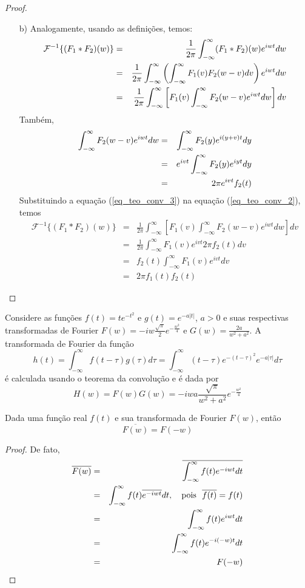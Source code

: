 \begin{proof}
\begin{itemize}
\item[b)] Analogamente, usando as definições, temos:
\begin{eqnarray}
\nonumber\mathcal{F}^{-1}\{(F_1*F_2)(w)\}&=&\frac{1}{2\pi}\int_{-\infty}^\infty (F_1*F_2)(w)e^{iwt}dw\\
\nonumber &=&\frac{1}{2\pi}\int_{-\infty}^\infty \left(\int_{-\infty}^\infty F_1(v)F_2(w-v)dv \right)e^{iwt}dw\\
&=&\frac{1}{2\pi}\int_{-\infty}^\infty\left[ F_1(v) \int_{-\infty}^\infty F_2(w-v)e^{iwt}dw \right]dv {\label{eq_teo_conv_2}}
\end{eqnarray}
Também,
\begin{eqnarray}
\nonumber \int_{-\infty}^\infty F_2(w-v)e^{iwt}dw&=&\int_{-\infty}^\infty F_2(y)e^{i(y+v)t}dy \\
\nonumber &=&e^{ivt}\int_{-\infty}^\infty F_2(y)e^{iyt}dy \\
&=&2\pi e^{ivt}f_2(t) {\label{eq_teo_conv_3}}
\end{eqnarray}
Substituindo a equação (\ref{eq_teo_conv_3}) na equação (\ref{eq_teo_conv_2}), temos
\begin{eqnarray*}
\mathcal{F}^{-1}\{(F_1*F_2)(w)\}&=&\frac{1}{2\pi}\int_{-\infty}^\infty\left[ F_1(v) \int_{-\infty}^\infty F_2(w-v)e^{iwt}dw \right]dv\\
&=&\frac{1}{2\pi}\int_{-\infty}^\infty  F_1(v) e^{ivt} 2\pi f_2(t) dv\\
&=&f_2(t)\int_{-\infty}^\infty F_1(v) e^{ivt} dv\\
&=&2\pi f_1(t)f_2(t)
\end{eqnarray*}

\end{itemize}
\end{proof}

\begin{ex}Considere as funções $f(t)=te^{-t^2}$ e $g(t)=e^{-a|t|}$, $a>0$ e suas respectivas transformadas de Fourier $F(w)=-iw\frac{\sqrt{\pi}}{2}e^{-\frac{w^2}{4}}$ e $G(w)=\frac{2a}{w^2+a^2}$. A transformada de Fourier da função 
$$
h(t)=\int_{-\infty}^\infty f(t-\tau)g(\tau)d\tau=\int_{-\infty}^\infty (t-\tau)e^{-(t-\tau)^2}e^{-a|\tau|}d\tau
$$
é calculada usando o teorema da convolução e é dada por
$$
H(w)=F(w)G(w)=-iwa\frac{\sqrt{\pi}}{w^2+a^2}e^{-\frac{w^2}{4}}
$$
\end{ex}


\begin{propr}[Conjugação] \label{prop_conj}Dada uma função real $f(t)$ e sua transformada de Fourier $F(w)$, então
$$
\overline{F(w)}=F(-w)
$$
\end{propr}
\begin{proof}
De fato,
\begin{eqnarray*}
\overline{F(w)}&=&\overline{\int_{-\infty}^\infty f(t)e^{-iwt}dt}\\
&=&\int_{-\infty}^\infty f(t)\overline{e^{-iwt}}dt,\quad \hbox{pois}\ \ \overline{f(t)}=f(t) \\
&=&\int_{-\infty}^\infty f(t)e^{iwt}dt\\
&=&\int_{-\infty}^\infty f(t)e^{-i(-w)t}dt\\
&=&F(-w)
\end{eqnarray*}
\end{proof}

